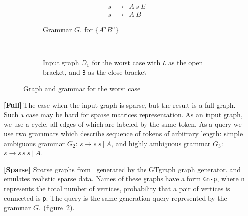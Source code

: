 \begin{figure}[h]
    \centering
    \begin{subfigure}[b]{0.20\textwidth}
        \centering
        \[
         \begin{array}{rcl}
           s & \rightarrow & A \ s \ B \\
           s & \rightarrow & A \ B
         \end{array}
         \]
        \caption{Grammar $G_1$ for $\{A^n B^n\}$}
    \end{subfigure}%
    ~\quad
    \begin{subfigure}[b]{0.24\textwidth}
        \centering

        \caption{Input graph $D_1$ for the worst case with \texttt{A} as the open bracket, and \texttt{B} as the close bracket}
        \label{fig:worstCaseGraph}
    \end{subfigure}%
    \caption{Graph and grammar for the worst case}
    \label{fig:grammar_example}
\end{figure}


\textbf{[Full]} The case when the input graph is sparse, but the result is a full graph.
Such a case may be hard for sparse matrices representation.
As an input graph, we use a cycle, all edges of which are labeled by the same token.
As a query we use two grammars which describe sequence of tokens of arbitrary length: simple ambiguous grammar $G_2$: $s \rightarrow  s \ s \ | \ A$,  and highly ambiguous grammar $G_3$: $s \rightarrow s \ s \ s \ | \ A$.

\textbf{[Sparse]} Sparse graphs from~\cite{fan2018scaling} generated by the GTgraph graph generator, and emulates realistic sparse data.
Names of these graphs have a form \texttt{Gn-p}, where \texttt{n} represents the total number of vertices, probability that a pair of vertices is connected is \texttt{p}.
The query is the same generation query represented by the grammar $G_1$ (figure~\ref{fig:grammar_example}).
